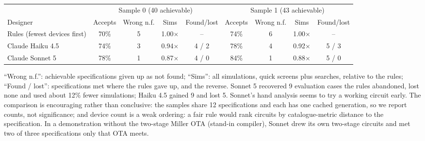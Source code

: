 \documentclass[10pt]{article}
\begin{document}
\begin{center}\small
\begin{tabular}{lcccc@{\hspace{14pt}}cccc}
\toprule
& \multicolumn{4}{c}{Sample 0 (40 achievable)} & \multicolumn{4}{c}{Sample 1 (43 achievable)} \\
\cmidrule(lr){2-5}\cmidrule(lr){6-9}
Designer & Accepts & Wrong n.f. & Sims & Found/lost & Accepts & Wrong n.f. & Sims & Found/lost \\
\midrule
Rules (fewest devices first) & 70\% & 5 & 1.00$\times$ & -- & 74\% & 6 & 1.00$\times$ & -- \\
Claude Haiku 4.5 & 74\% & 3 & 0.94$\times$ & 4 / 2 & 78\% & 4 & 0.92$\times$ & 5 / 3 \\
Claude Sonnet 5 & 78\% & 1 & 0.87$\times$ & 4 / 0 & 84\% & 1 & 0.88$\times$ & 5 / 0 \\
\bottomrule
\end{tabular}
\end{center}
\vspace{-3pt}
``Wrong n.f.'': achievable specifications given up as not found; ``Sims'': all simulations, quick screens plus searches, relative to the rules;
``Found / lost'': specifications met where the rules gave up, and the reverse. Sonnet 5 recovered 9 evaluation cases the
rules abandoned, lost none and used about 12\% fewer simulations; Haiku 4.5 gained 9 and lost 5. Sonnet's hand analysis seems to try a working circuit early. The comparison is encouraging rather than conclusive: the samples share 12 specifications and each has one cached
generation, so we report counts, not significance; and device count is a weak ordering: a fair rule would rank
circuits by catalogue-metric distance to the specification. In a demonstration without the two-stage Miller OTA
(stand-in compiler), Sonnet drew its
own two-stage circuits and met two of three specifications only that OTA meets.

\end{document}
